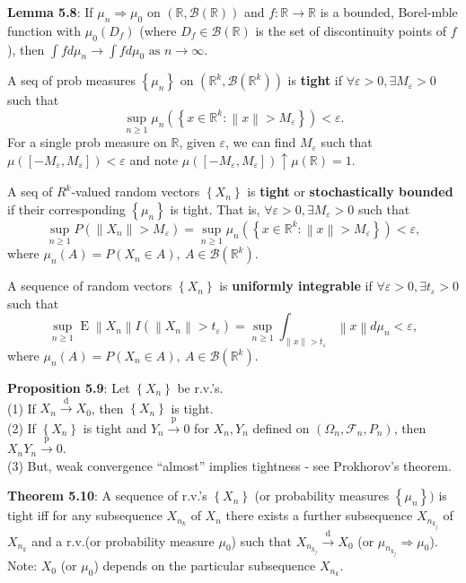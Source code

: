 \documentclass[paper=letter,fontsize=2.89mm]{scrartcl}
\DeclareMathOperator{\E}{E}
\newcommand{\convdist}{\stackrel{\text{d}}{\longrightarrow}}
\newcommand{\convprob}{\stackrel{\text{p}}{\longrightarrow}}
\newcommand{\Borel}{\mathcal{B}}
\newcommand{\eps}{\varepsilon}
\newcommand{\R}{\mathbb{R}}
\newcommand\norm[1]{\left\lVert #1 \right\rVert}
\newcommand\set[1]{\left\{ #1 \right\}}
\begin{document}
\begin{multicols*}{3}
\textbf{Lemma 5.8}: If $\mu_n \Rightarrow \mu_0$ on $(\R, \Borel(\R))$ and $f: \R \to \R$ is a bounded, Borel-mble function with $\mu_0(D_f)$ (where $D_f \in \Borel(\R)$ is the set of discontinuity points of $f$), then $\int fd\mu_n \to \int f d\mu_0 \text{ as } n \to \infty.$ \\ \medskip

A seq of prob measures $\set{\mu_n}$ on $(\R^k, \Borel(\R^k))$ is \textbf{tight} if $\forall \eps >0, \exists M_\eps > 0 $ such that
$$\sup_{n\ge1} \mu_n\left(\set{x\in\R^k: \norm{x} > M_\eps}\right) < \eps.$$
For a single prob measure on $\R$, given $\eps$, we can find $M_\eps$ such that $\mu([-M_\eps, M_\eps]) < \eps$ and note $\mu([-M_\eps, M_\eps]) \uparrow \mu(\R) = 1$. \\ \medskip

A seq of $R^k$-valued random vectors $\set{X_n}$ is \textbf{tight} or \textbf{stochastically bounded} if their corresponding $\set{\mu_n}$ is tight. That is, $\forall \eps > 0, \exists M_\eps > 0$ such that
$$\sup_{n\ge1}P(\norm{X_n} > M_\eps) = \sup_{n\ge1}\mu_n\left(\set{x \in \R^k: \norm{x} > M_\eps }\right) < \eps,$$
where $\mu_n(A) = P(X_n \in A), ~ A \in \Borel(\R^k)$. \\ \medskip

A sequence of random vectors $\set{X_n}$ is \textbf{uniformly integrable} if $\forall \eps > 0, \exists t_\eps > 0$ such that
$$\sup_{n\ge1}\E \norm{X_n} I(\norm{X_n} > t_\eps) = \sup_{n\ge1}\int_{\norm{x} > t_\eps} \norm{x} d\mu_n < \eps,$$
where $\mu_n(A) = P(X_n \in A), ~ A \in \Borel(\R^k)$. \\ \medskip

\textbf{Proposition 5.9}: Let $\set{X_n}$ be r.v.'s. \\
(1) If $X_n \convdist X_0$, then $\set{X_n}$ is tight. \\
(2) If $\set{X_n}$ is tight and $Y_n \convprob 0$ for $X_n, Y_n$ defined on $(\Omega_n, \mathcal{F}_n, P_n)$, then $X_nY_n \convprob 0$. \\
(3) But, weak convergence ``almost'' implies tightness - see Prokhorov's theorem. \\ \medskip

\textbf{Theorem 5.10}: A sequence of r.v.'s $\set{X_n}$ (or probability measures $\set{\mu_n})$ is tight iff for any subsequence $X_{n_k}$ of $X_n$ there exists a further subsequence $X_{n_{k_j}}$ of $X_{n_k}$ and a r.v.\@ (or probability measure $\mu_0$) such that $X_{n_{k_j}} \convdist X_0$ (or $\mu_{n_{k_j}} \Rightarrow \mu_0$). Note: $X_0$ (or $\mu_0$) depends on the particular subsequence $X_{n_k}$.  \\ \medskip


\end{multicols*}
\end{document}
